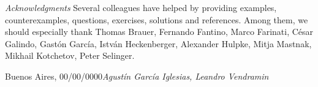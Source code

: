 \preface

%
%
%
% 
%




\textit{Acknowledgments} Several colleagues have helped by providing examples, counterexamples,
questions, exercises, solutions and references.  Among them, we should
especially thank Thomas Brauer, Fernando Fantino, Marco Farinati, C\'esar
Galindo, Gast\'on Garc\'ia, Istv\'an Heckenberger, Alexander Hulpke, Mitja Mastnak, Mikhail Kotchetov, Peter Selinger.

\vspace{\baselineskip}
\begin{flushright}\noindent
Buenos Aires, 00/00/0000\hfill {\it Agust\'in Garc\'ia Iglesias, Leandro Vendramin}\\
\end{flushright}


